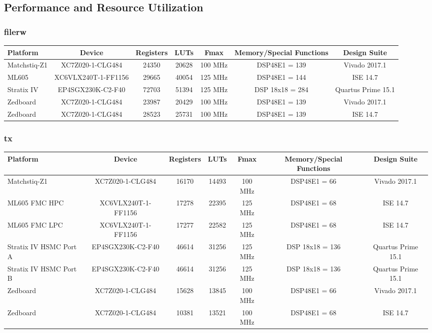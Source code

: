 \subsection{Performance and Resource Utilization}
\begin{scriptsize}
\subsubsection{filerw}
\begin{tabular}{|P{1.8cm}|c|c|c|c|c|c|}
\hline
{}
Platform     & Device              & Registers & LUTs  & Fmax    & Memory/Special Functions & Design Suite       \\
\hline
Matchstiq-Z1 & XC7Z020-1-CLG484    & 24350     & 20628 & 100 MHz & DSP48E1 = 139            & Vivado 2017.1      \\
\hline
ML605        & XC6VLX240T-1-FF1156 & 29665     & 40054 & 125 MHz & DSP48E1 = 144            & ISE 14.7           \\
\hline
Stratix IV   & EP4SGX230K-C2-F40   & 72703     & 51394 & 125 MHz & DSP 18x18 = 284          & Quartus Prime 15.1 \\
\hline
Zedboard     & XC7Z020-1-CLG484    & 23987     & 20429 & 100 MHz & DSP48E1 = 139            & Vivado 2017.1      \\
\hline
Zedboard     & XC7Z020-1-CLG484    & 28523     & 25731 & 100 MHz & DSP48E1 = 139            & ISE 14.7		     \\
\hline
\end{tabular}
\subsubsection{tx}
\begin{tabular}{|P{1.8cm}|c|c|c|c|c|c|}
\hline
{}
Platform               & Device              & Registers & LUTs  & Fmax    & Memory/Special Functions & Design Suite       \\
\hline
Matchstiq-Z1           & XC7Z020-1-CLG484    & 16170     & 14493 & 100 MHz & DSP48E1 = 66             & Vivado 2017.1      \\
\hline
ML605 FMC HPC          & XC6VLX240T-1-FF1156 & 17278     & 22395 & 125 MHz & DSP48E1 = 68             & ISE 14.7           \\
\hline
ML605 FMC LPC          & XC6VLX240T-1-FF1156 & 17277     & 22582 & 125 MHz & DSP48E1 = 68             & ISE 14.7           \\
\hline
Stratix IV HSMC Port A & EP4SGX230K-C2-F40   & 46614     & 31256 & 125 MHz & DSP 18x18 = 136          & Quartus Prime 15.1 \\
\hline
Stratix IV HSMC Port B & EP4SGX230K-C2-F40   & 46614     & 31256 & 125 MHz & DSP 18x18 = 136          & Quartus Prime 15.1 \\
\hline
Zedboard               & XC7Z020-1-CLG484    & 15628     & 13845 & 100 MHz & DSP48E1 = 66             & Vivado 2017.1      \\
\hline
Zedboard               & XC7Z020-1-CLG484    & 10381     & 13521 & 100 MHz & DSP48E1 = 68             & ISE 14.7 		   \\
\hline
\end{tabular}

\end{scriptsize}
